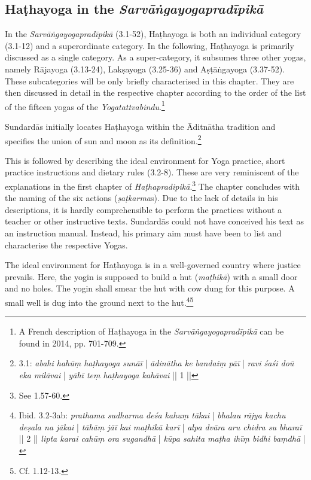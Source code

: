 \subsection{Haṭhayoga in the \textit{Sarvāṅgayogapradīpikā}}

In the \textit{Sarvāṅgayogapradīpikā} (3.1-52), Haṭhayoga is both an individual category (3.1-12) and a superordinate category. In the following, Haṭhayoga is primarily discussed as a single category. As a super-category, it subsumes three other yogas, namely Rājayoga (3.13-24), Lakṣayoga (3.25-36) and Aṣṭāṅgayoga (3.37-52). These subcategories will be only briefly characterised in this chapter. They are then discussed in detail in the respective chapter according to the order of the list of the fifteen yogas of the \textit{Yogatattvabindu}.\footnote{A French description of Haṭhayoga in the \textit{Sarvāṅgayogapradīpikā} can be found in \citeauthor{burger2014sarvangayogapradipika} 2014, pp. 701-709.}

Sundardās initially locates Haṭhayoga within the Āditnātha tradition and specifies the union of sun and moon as its definition.\footnote{ 3.1: \textit{abahi hahūṃ haṭhayoga sunāī} | \textit{ādinātha ke bandaiṃ pāī} | \textit{ravi śaśi doū eka milāvai} | \textit{yāhī teṃ haṭhayoga kahāvai} || 1 ||}

This is followed by describing the ideal environment for Yoga practice, short practice instructions and dietary rules (3.2-8). These are very reminiscent of the explanations in the first chapter of \textit{Haṭhapradipikā}.\footnote{See  1.57-60.} The chapter concludes with the naming of the six actions (\textit{ṣaṭkarma}s). Due to the lack of details in his descriptions, it is hardly comprehensible to perform the practices without a teacher or other instructive texts. Sundardās could not have conceived his text as an instruction manual. Instead, his primary aim must have been to list and characterise the respective Yogas.

The ideal environment for Haṭhayoga is in a well-governed country where justice prevails. Here, the yogin is supposed to build a hut (\textit{maṭhikā}) with a small door and no holes. The yogin shall smear the hut with cow dung for this purpose. A small well is dug into the ground next to the hut.\footnote{Ibid. 3.2-3ab: \textit{prathama sudharma deśa kahuṃ tākai} | \textit{bhalau rājya kachu deṣala na jākai} | \textit{tāhāṃ jāī kai maṭhikā karī} | \textit{alpa dvāra aru chidra su bharaī} || 2 || \textit{lipta karai cahūṃ ora sugandhā} | \textit{kūpa sahita maṭha ihīṃ bidhi baṃdhā} |}\footnote{Cf.  1.12-13.}

